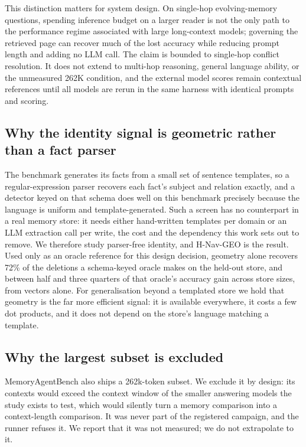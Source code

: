 \documentclass[journal=jcisd8,manuscript=article]{achemso}
\begin{document}
This distinction matters for system design. On single-hop evolving-memory questions, spending inference budget on a larger reader is not the only path to the performance regime associated with large long-context models; governing the retrieved page can recover much of the lost accuracy while reducing prompt length and adding no LLM call. The claim is bounded to single-hop conflict resolution. It does not extend to multi-hop reasoning, general language ability, or the unmeasured 262K condition, and the external model scores remain contextual references until all models are rerun in the same harness with identical prompts and scoring.

\subsection{Why the identity signal is geometric rather than a fact parser}

The benchmark generates its facts from a small set of sentence templates, so a regular-expression parser recovers each fact's subject and relation exactly, and a detector keyed on that schema does well on this benchmark precisely because the language is uniform and template-generated. Such a screen has no counterpart in a real memory store: it needs either hand-written templates per domain or an LLM extraction call per write, the cost and the dependency this work sets out to remove. We therefore study parser-free identity, and H-Nav-GEO is the result. Used only as an oracle reference for this design decision, geometry alone recovers 72\% of the deletions a schema-keyed oracle makes on the held-out store, and between half and three quarters of that oracle's accuracy gain across store sizes, from vectors alone. For generalisation beyond a templated store we hold that geometry is the far more efficient signal: it is available everywhere, it costs a few dot products, and it does not depend on the store's language matching a template.

\subsection{Why the largest subset is excluded}

MemoryAgentBench also ships a 262k-token subset. We exclude it by design: its contexts would exceed the context window of the smaller answering models the study exists to test, which would silently turn a memory comparison into a context-length comparison. It was never part of the registered campaign, and the runner refuses it. We report that it was not measured; we do not extrapolate to it.
\end{document}

